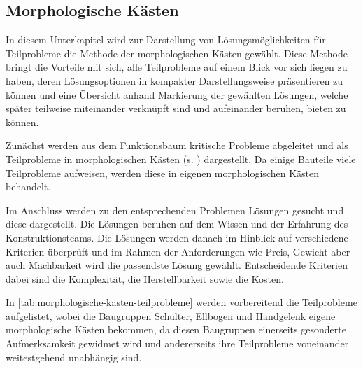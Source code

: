 		\subsection{Morphologische Kästen}
			In diesem Unterkapitel wird zur Darstellung von Lösungsmöglichkeiten für Teilprobleme die Methode der morphologischen Kästen gewählt. Diese Methode bringt die Vorteile mit sich, alle Teilprobleme auf einem Blick vor sich liegen zu haben, deren Lösungsoptionen in kompakter Darstellungsweise präsentieren zu können und eine Übersicht anhand Markierung der gewählten Lösungen, welche später teilweise miteinander verknüpft sind und aufeinander beruhen, bieten zu können.\par\medskip
			Zunächst werden aus dem Funktionsbaum kritische Probleme abgeleitet und als Teilprobleme in morphologischen Kästen (s. ) dargestellt. Da einige Bauteile viele Teilprobleme aufweisen, werden diese in eigenen morphologischen Kästen behandelt.\par
			Im Anschluss werden zu den entsprechenden Problemen Lösungen gesucht und diese dargestellt. Die Lösungen beruhen auf dem Wissen und der Erfahrung des Konstruktionsteams. Die Lösungen werden danach im Hinblick auf verschiedene Kriterien überprüft und im Rahmen der Anforderungen wie Preis, Gewicht aber auch Machbarkeit wird die passendste Lösung gewählt. Entscheidende Kriterien dabei sind die Komplexität, die Herstellbarkeit sowie die Kosten.\par\medskip
			In \cref{tab:morphologische-kasten-teilprobleme} werden vorbereitend die Teilprobleme aufgelistet, wobei die Baugruppen Schulter, Ellbogen
			und Handgelenk eigene morphologische Kästen bekommen, da diesen Baugruppen einerseits gesonderte Aufmerksamkeit gewidmet wird und andererseits ihre Teilprobleme voneinander weitestgehend unabhängig sind. 

